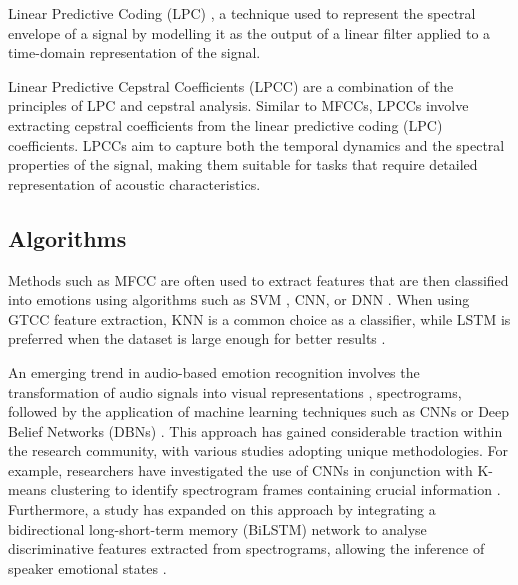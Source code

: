 Linear Predictive Coding (LPC) \cite{OShaughnessy1988-ws}, a technique used to represent the spectral envelope of a signal by modelling it as the output of a linear filter applied to a time-domain representation of the signal.

Linear Predictive Cepstral Coefficients (LPCC) \cite{6895780} are a combination of the principles of LPC and cepstral analysis. Similar to MFCCs, LPCCs involve extracting cepstral coefficients from the linear predictive coding (LPC) coefficients. LPCCs aim to capture both the temporal dynamics and the spectral properties of the signal, making them suitable for tasks that require detailed representation of acoustic characteristics.

\subsection{Algorithms}

Methods such as MFCC are often used to extract features that are then classified into emotions using algorithms such as SVM \cite{Khan2023-nz}, CNN, or DNN \cite{Shanta2021-af} \cite{Qayyum2019-bt}. When using GTCC feature extraction, KNN is a common choice as a classifier, while LSTM is preferred when the dataset is large enough for better results \cite{Zhu2019-iq}.

An emerging trend in audio-based emotion recognition involves the transformation of audio signals into visual representations \cite{Augello2022-hm}, spectrograms, followed by the application of machine learning techniques such as CNNs \cite{Jaiswal2020-vi} or Deep Belief Networks (DBNs) \cite{Mohammed2020-ig}. This approach has gained considerable traction within the research community, with various studies adopting unique methodologies. For example, researchers have investigated the use of CNNs in conjunction with K-means clustering to identify spectrogram frames containing crucial information \cite{Hajarolasvadi2019-nz}. Furthermore, a study has expanded on this approach by integrating a bidirectional long-short-term memory (BiLSTM) network to analyse discriminative features extracted from spectrograms, allowing the inference of speaker emotional states \cite{Mustaqeem2020-ax}.

